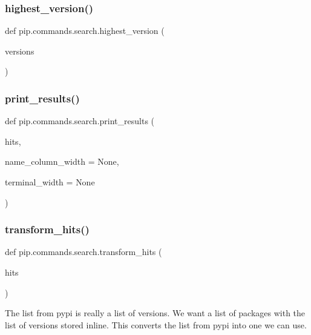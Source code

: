 \subsubsection{\texorpdfstring{highest\+\_\+version()}{highest\_version()}}
{\footnotesize\ttfamily def pip.\+commands.\+search.\+highest\+\_\+version (\begin{DoxyParamCaption}\item[{}]{versions }\end{DoxyParamCaption})}

\mbox{\label{namespacepip_1_1commands_1_1search_aa47cac5590d7a1d7b284d2441e398b2b}} 
\subsubsection{\texorpdfstring{print\+\_\+results()}{print\_results()}}
{\footnotesize\ttfamily def pip.\+commands.\+search.\+print\+\_\+results (\begin{DoxyParamCaption}\item[{}]{hits,  }\item[{}]{name\+\_\+column\+\_\+width = {\ttfamily None},  }\item[{}]{terminal\+\_\+width = {\ttfamily None} }\end{DoxyParamCaption})}

\mbox{\label{namespacepip_1_1commands_1_1search_aa00a19f6ffdaf3df3e019203b7ba31b1}} 
\subsubsection{\texorpdfstring{transform\+\_\+hits()}{transform\_hits()}}
{\footnotesize\ttfamily def pip.\+commands.\+search.\+transform\+\_\+hits (\begin{DoxyParamCaption}\item[{}]{hits }\end{DoxyParamCaption})}

\begin{DoxyVerb}The list from pypi is really a list of versions. We want a list of
packages with the list of versions stored inline. This converts the
list from pypi into one we can use.
\end{DoxyVerb}
 

